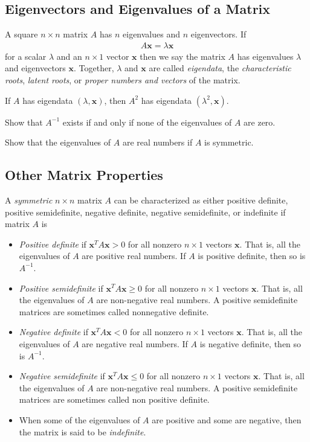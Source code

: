 \subsection{Eigenvectors and Eigenvalues of a Matrix}

A square $n\times n$ matrix $A$ has $n$ eigenvalues and $n$ eigenvectors. If 
%
\begin{align}
	A \bm{x} = \lambda \bm{x}
\end{align}
%
for a scalar $\lambda$ and an $n \times 1$  vector $\bm{x}$ then we say the matrix $A$ has eigenvalues $\lambda$ and eigenvectors $\bm{x}$. Together, $\lambda$ and $\bm{x}$ are called \textit{eigendata}, the \textit{characteristic roots}, \textit{latent roots}, or \textit{proper numbers and vectors} of the matrix.

\begin{homework}
	If $A$ has eigendata $\left(\lambda, \bm{x}\right)$, then $A^2$ has eigendata $\left(\lambda^2, \bm{x}\right)$. 
\end{homework}
%
\begin{homework}
	Show that $A^{-1}$ exists if and only if none of the eigenvalues of $A$ are zero.
\end{homework}
%
\begin{homework}
	Show that the eigenvalues of $A$ are real numbers if $A$ is symmetric.
\end{homework}

\subsection{Other Matrix Properties}
%
A \textit{symmetric} $n \times n$ matrix $A$ can be characterized as either positive definite, positive semidefinite, negative definite, negative semidefinite, or indefinite if matrix $A$ is
%
\begin{itemize}
	\item \textit{Positive definite} if $\bm{x}^TA\bm{x}>0$ for all nonzero $n \times 1$ vectors $\bm{x}$. That is, all the eigenvalues of $A$ are positive real numbers.  If $A$ is positive definite, then so is $A^{-1}$.
	\item \textit{Positive semidefinite} if $\bm{x}^TA\bm{x} \ge 0$ for all nonzero $n \times 1$ vectors $\bm{x}$. That is, all the eigenvalues of $A$ are non-negative real numbers. A positive semidefinite matrices are sometimes called nonnegative definite.
	\item \textit{Negative definite} if $\bm{x}^TA\bm{x} < 0$ for all nonzero $n \times 1$ vectors $\bm{x}$. That is, all the eigenvalues of $A$ are negative real numbers.  If $A$ is negative definite, then so is $A^{-1}$.
	\item \textit{Negative semidefinite} if $\bm{x}^TA\bm{x} \le 0$ for all nonzero $n \times 1$ vectors $\bm{x}$. That is, all the eigenvalues of $A$ are non-negative real numbers. A positive semidefinite matrices are sometimes called non positive definite.
	\item When some of the eigenvalues of $A$ are positive and some are negative, then the matrix is said to be \textit{indefinite}.
\end{itemize}

